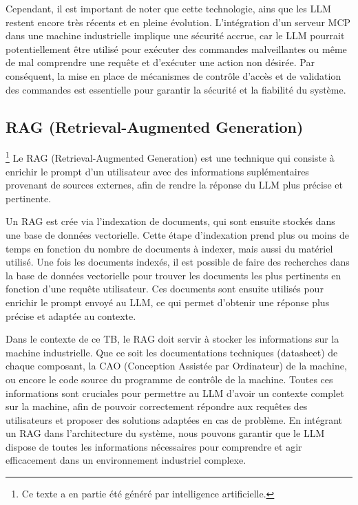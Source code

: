 Cependant, il est important de noter que cette technologie, ains que les LLM restent encore très récents et en pleine évolution. L'intégration d'un serveur MCP dans une machine industrielle implique une sécurité accrue, car le LLM pourrait potentiellement être utilisé pour exécuter des commandes malveillantes ou même de mal comprendre une requête et d'exécuter une action non désirée. Par conséquent, la mise en place de mécanismes de contrôle d'accès et de validation des commandes est essentielle pour garantir la sécurité et la fiabilité du système.

\subsection{RAG (Retrieval-Augmented Generation)}\footnote{Ce texte a en partie été généré par intelligence artificielle.}
Le RAG (Retrieval-Augmented Generation) est une technique qui consiste à enrichir le prompt d'un utilisateur avec des informations suplémentaires provenant de sources externes, afin de rendre la réponse du LLM plus précise et pertinente.

Un RAG est crée via l'indexation de documents, qui sont ensuite stockés dans une base de données vectorielle. Cette étape d'indexation prend plus ou moins de temps en fonction du nombre de documents à indexer, mais aussi du matériel utilisé. Une fois les documents indexés, il est possible de faire des recherches dans la base de données vectorielle pour trouver les documents les plus pertinents en fonction d'une requête utilisateur. Ces documents sont ensuite utilisés pour enrichir le prompt envoyé au LLM, ce qui permet d'obtenir une réponse plus précise et adaptée au contexte.

Dans le contexte de ce TB, le RAG doit servir à stocker les informations sur la machine industrielle. Que ce soit les documentations techniques (datasheet) de chaque composant, la CAO (Conception Assistée par Ordinateur) de la machine, ou encore le code source du programme de contrôle de la machine. Toutes ces informations sont cruciales pour permettre au LLM d'avoir un contexte complet sur la machine, afin de pouvoir correctement répondre aux requêtes des utilisateurs et proposer des solutions adaptées en cas de problème. En intégrant un RAG dans l'architecture du système, nous pouvons garantir que le LLM dispose de toutes les informations nécessaires pour comprendre et agir efficacement dans un environnement industriel complexe.